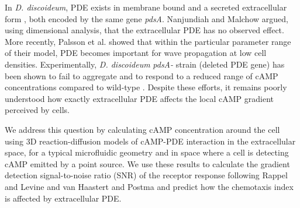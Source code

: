 \documentclass[%
 reprint,
 amsmath,amssymb,
 aps,prl,
 showpacs,
 linenumbers
]{revtex4-1}
\begin{document}
In \emph{D. discoideum}, PDE exists in membrane bound and a secreted extracellular form \cite{PDE,pde2,pde3,pde-purification}, both encoded by the same gene \emph{pdsA}. Nanjundiah and Malchow \cite{mechanism1} argued, using dimensional analysis, that the extracellular PDE has no observed effect. More recently, Palsson et al. \cite{palsson0,palsson1,palsson2} showed that within the particular parameter range of their model, PDE becomes important for wave propagation at low cell densities. Experimentally, \emph{D. discoideum} \emph{pdsA-} strain (deleted PDE gene) has been shown to fail to aggregate \cite{pde-knockouts1,pde-knockouts2} and to respond to a reduced range of cAMP concentrations compared to wild-type \cite{pdsA1}. Despite these efforts, it remains poorly understood how exactly extracellular PDE affects the local cAMP gradient perceived by cells.

We address this question by calculating cAMP concentration around the cell using 3D reaction-diffusion models of cAMP-PDE interaction in the extracellular space, for a typical microfluidic geometry \cite{me,wu} and in space where a cell is detecting cAMP emitted by a point source. 
We use these results to calculate the gradient detection signal-to-noise ratio (SNR) of the receptor response following Rappel and Levine \cite{rappelherbie2} and van Haastert and Postma \cite{SNRvh} and predict how the chemotaxis index is affected by extracellular PDE.
\end{document}
